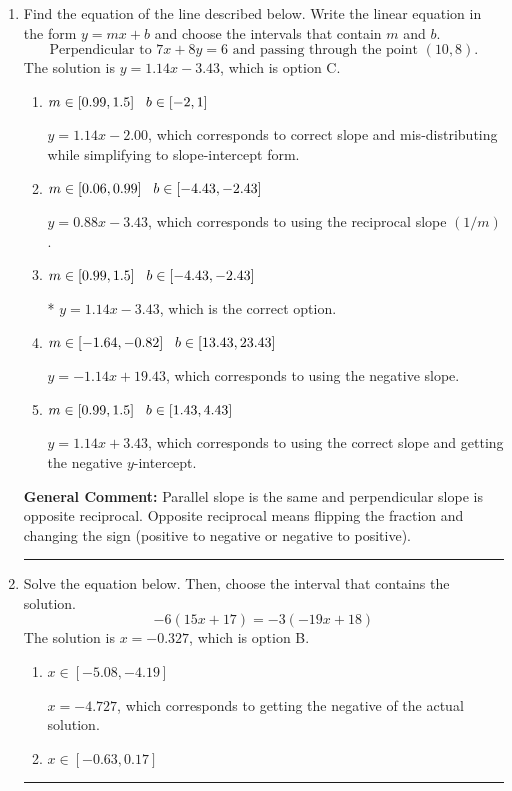 \documentclass{extbook}[14pt]
\newcommand{\litem}[1]{\item #1

\rule{\textwidth}{0.4pt}}
\begin{document}
\begin{enumerate}\litem{
Find the equation of the line described below. Write the linear equation in the form $ y=mx+b $ and choose the intervals that contain $m$ and $b$.
\[ \text{Perpendicular to } 7 x + 8 y = 6 \text{ and passing through the point } (10, 8). \]The solution is \( y = 1.14x - 3.43 \), which is option C.\begin{enumerate}[label=\Alph*.]
\item \( m \in [0.99, 1.5] \hspace*{3mm} b \in [-2, 1] \)

 $y = 1.14x - 2.00$, which corresponds to correct slope and mis-distributing while simplifying to slope-intercept form.
\item \( m \in [0.06, 0.99] \hspace*{3mm} b \in [-4.43, -2.43] \)

 $y = 0.88x - 3.43$, which corresponds to using the reciprocal slope $(1/m)$.
\item \( m \in [0.99, 1.5] \hspace*{3mm} b \in [-4.43, -2.43] \)

* $y = 1.14x - 3.43$, which is the correct option.
\item \( m \in [-1.64, -0.82] \hspace*{3mm} b \in [13.43, 23.43] \)

 $y = -1.14x + 19.43$, which corresponds to using the negative slope.
\item \( m \in [0.99, 1.5] \hspace*{3mm} b \in [1.43, 4.43] \)

 $y = 1.14x + 3.43$, which corresponds to using the correct slope and getting the negative $y$-intercept.
\end{enumerate}

\textbf{General Comment:} Parallel slope is the same and perpendicular slope is opposite reciprocal. Opposite reciprocal means flipping the fraction and changing the sign (positive to negative or negative to positive).
}
\litem{
Solve the equation below. Then, choose the interval that contains the solution.
\[ -6(15x + 17) = -3(-19x + 18) \]The solution is \( x = -0.327 \), which is option B.\begin{enumerate}[label=\Alph*.]
\item \( x \in [-5.08, -4.19] \)

$x = -4.727$, which corresponds to getting the negative of the actual solution.
\item \( x \in [-0.63, 0.17] \)


\end{enumerate}}
\end{enumerate}
\end{document}
